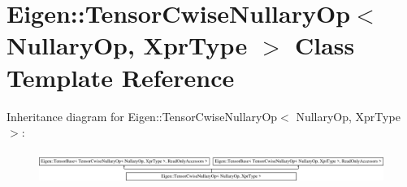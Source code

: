 \hypertarget{class_eigen_1_1_tensor_cwise_nullary_op}{}\section{Eigen\+:\+:Tensor\+Cwise\+Nullary\+Op$<$ Nullary\+Op, Xpr\+Type $>$ Class Template Reference}
\label{class_eigen_1_1_tensor_cwise_nullary_op}
Inheritance diagram for Eigen\+:\+:Tensor\+Cwise\+Nullary\+Op$<$ Nullary\+Op, Xpr\+Type $>$\+:\begin{figure}[H]
\begin{center}
\leavevmode
\includegraphics[height=1.027523cm]{class_eigen_1_1_tensor_cwise_nullary_op}
\end{center}
\end{figure}
